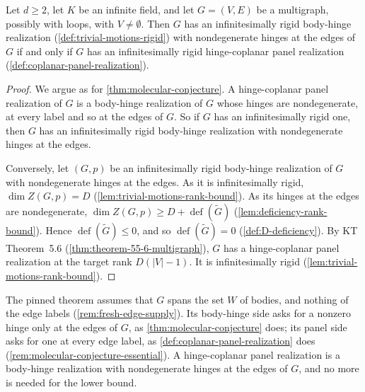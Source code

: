\begin{theorem}
  \label{thm:molecular-conjecture-multigraph}
  \leanok
  Let $d \ge 2$, let $K$ be an infinite field, and let $G = (V, E)$ be a
  multigraph, possibly with loops, with $V \neq \emptyset$. Then $G$ has
  an infinitesimally rigid body-hinge realization
  (\cref{def:trivial-motions-rigid}) with nondegenerate hinges at the
  edges of $G$ if and
  only if $G$ has an infinitesimally rigid hinge-coplanar panel
  realization (\cref{def:coplanar-panel-realization}).
\end{theorem}
\begin{proof}
  \leanok
  We argue as for \cref{thm:molecular-conjecture}. A hinge-coplanar
  panel realization of $G$ is a body-hinge realization of $G$ whose
  hinges are nondegenerate, at every label and so at the edges of $G$. So
  if $G$ has an infinitesimally rigid one, then $G$ has an infinitesimally
  rigid body-hinge realization with nondegenerate hinges at the edges.

  Conversely, let $(G, p)$ be an infinitesimally rigid body-hinge
  realization of $G$ with nondegenerate hinges at the edges. As it is
  infinitesimally rigid, $\dim Z(G, p) = D$
  (\cref{lem:trivial-motions-rank-bound}). As its hinges at the edges are
  nondegenerate,
  $\dim Z(G, p) \ge D + \operatorname{def}(\tilde G)$
  (\cref{lem:deficiency-rank-bound}). Hence
  $\operatorname{def}(\tilde G) \le 0$, and so
  $\operatorname{def}(\tilde G) = 0$ (\cref{def:D-deficiency}). By KT
  Theorem~5.6 (\cref{thm:theorem-55-6-multigraph}), $G$ has a
  hinge-coplanar panel realization at the target rank $D(|V| - 1)$. It
  is infinitesimally rigid (\cref{lem:trivial-motions-rank-bound}).
\end{proof}

\begin{fmlnote}
  The pinned theorem assumes that $G$ spans the set $W$ of bodies, and
  nothing of the edge labels (\cref{rem:fresh-edge-supply}). Its
  body-hinge side asks for a nonzero hinge only at the edges of $G$, as
  \cref{thm:molecular-conjecture} does; its panel side asks for one at
  every edge label, as \cref{def:coplanar-panel-realization} does
  (\cref{rem:molecular-conjecture-essential}). A hinge-coplanar panel
  realization is a body-hinge realization with nondegenerate hinges at
  the edges of $G$, and no more is needed for the lower bound.
\end{fmlnote}

